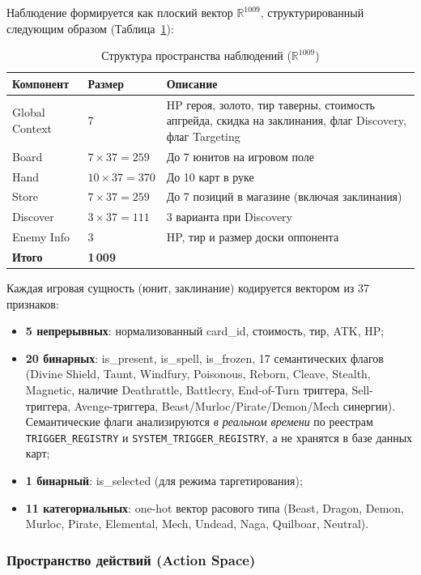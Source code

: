 \documentclass[a4paper,12pt]{extarticle}
\begin{document}
Наблюдение формируется как плоский вектор $\mathbb{R}^{1009}$, структурированный следующим образом (Таблица~\ref{tab:obs_space}):

\begin{longtable}{p{3.5cm}p{3cm}p{7cm}}
\caption{Структура пространства наблюдений ($\mathbb{R}^{1009}$)}\label{tab:obs_space}\\
\toprule
\textbf{Компонент} & \textbf{Размер} & \textbf{Описание} \\
\midrule
Global Context & 7 & HP героя, золото, тир таверны, стоимость апгрейда, скидка на заклинания, флаг Discovery, флаг Targeting \\
Board & $7 \times 37 = 259$ & До 7 юнитов на игровом поле \\
Hand & $10 \times 37 = 370$ & До 10 карт в руке \\
Store & $7 \times 37 = 259$ & До 7 позиций в магазине (включая заклинания) \\
Discover & $3 \times 37 = 111$ & 3 варианта при Discovery \\
Enemy Info & 3 & HP, тир и размер доски оппонента \\
\midrule
\textbf{Итого} & \textbf{1\,009} & \\
\bottomrule
\end{longtable}

Каждая игровая сущность (юнит, заклинание) кодируется вектором из 37 признаков:
\begin{itemize}[noitemsep]
  \item \textbf{5 непрерывных}: нормализованный card\_id, стоимость, тир, ATK, HP;
  \item \textbf{20 бинарных}: is\_present, is\_spell, is\_frozen, 17 семантических флагов (Divine Shield, Taunt, Windfury, Poisonous, Reborn, Cleave, Stealth, Magnetic, наличие Deathrattle, Battlecry, End-of-Turn триггера, Sell-триггера, Avenge-триггера, Beast/Murloc/Pirate/Demon/Mech синергии). Семантические флаги анализируются \emph{в реальном времени} по реестрам \texttt{TRIGGER\_REGISTRY} и \texttt{SYSTEM\_TRIGGER\_REGISTRY}, а не хранятся в базе данных карт;
  \item \textbf{1 бинарный}: is\_selected (для режима таргетирования);
  \item \textbf{11 категориальных}: one-hot вектор расового типа (Beast, Dragon, Demon, Murloc, Pirate, Elemental, Mech, Undead, Naga, Quilboar, Neutral).
\end{itemize}

\subsubsection{Пространство действий (Action Space)}
\end{document}
